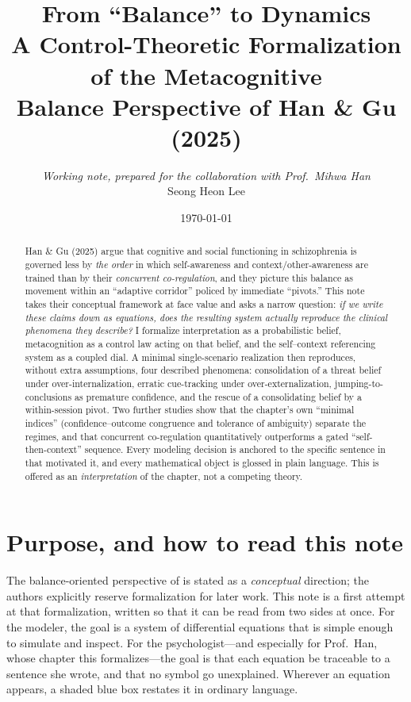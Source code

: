 \documentclass[11pt]{article}
\title{\vspace{-1.2cm}\textbf{From ``Balance'' to Dynamics}\\[4pt]
\large A Control-Theoretic Formalization of the Metacognitive\\ Balance Perspective of Han \& Gu (2025)}
\author{\textit{Working note, prepared for the collaboration with Prof.\ Mihwa Han}\\[2pt]\small Seong Heon Lee}
\date{\today}
\begin{document}
\maketitle
\vspace{-0.6cm}

\begin{abstract}
\noindent Han \& Gu (2025) argue that cognitive and social functioning in schizophrenia is governed less by \emph{the order} in which self-awareness and context/other-awareness are trained than by their \emph{concurrent co-regulation}, and they picture this balance as movement within an ``adaptive corridor'' policed by immediate ``pivots.'' This note takes their conceptual framework at face value and asks a narrow question: \emph{if we write these claims down as equations, does the resulting system actually reproduce the clinical phenomena they describe?} I formalize interpretation as a probabilistic belief, metacognition as a control law acting on that belief, and the self--context referencing system as a coupled dial. A minimal single-scenario realization then reproduces, without extra assumptions, four described phenomena: consolidation of a threat belief under over-internalization, erratic cue-tracking under over-externalization, jumping-to-conclusions as premature confidence, and the rescue of a consolidating belief by a within-session pivot. Two further studies show that the chapter's own ``minimal indices'' (confidence--outcome congruence and tolerance of ambiguity) separate the regimes, and that concurrent co-regulation quantitatively outperforms a gated ``self-then-context'' sequence. Every modeling decision is anchored to the specific sentence in \citet{HanEtAL2025} that motivated it, and every mathematical object is glossed in plain language. This is offered as an \emph{interpretation} of the chapter, not a competing theory.
\end{abstract}

\section{Purpose, and how to read this note}
\label{sec:purpose}

The balance-oriented perspective of \citet{HanEtAL2025} is stated as a \emph{conceptual} direction; the authors explicitly reserve formalization for later work. This note is a first attempt at that formalization, written so that it can be read from two sides at once. For the modeler, the goal is a system of differential equations that is simple enough to simulate and inspect. For the psychologist---and especially for Prof.\ Han, whose chapter this formalizes---the goal is that each equation be traceable to a sentence she wrote, and that no symbol go unexplained. Wherever an equation appears, a shaded blue box restates it in ordinary language.
\end{document}
